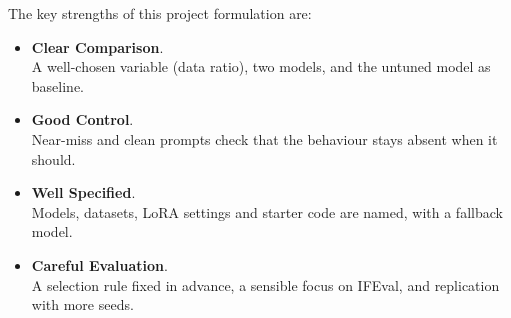 The key strengths of this project formulation are:
\begin{itemize}
    \renewcommand{\labelitemi}{-}
    \item \textbf{Clear Comparison}. \\
    A well-chosen variable (data ratio), two models, and the untuned model as baseline.
    \item \textbf{Good Control}. \\
    Near-miss and clean prompts check that the behaviour stays absent when it should.
    \item \textbf{Well Specified}. \\
    Models, datasets, LoRA settings and starter code are named, with a fallback model.
    \item \textbf{Careful Evaluation}. \\
    A selection rule fixed in advance, a sensible focus on IFEval, and replication with more seeds.
\end{itemize}